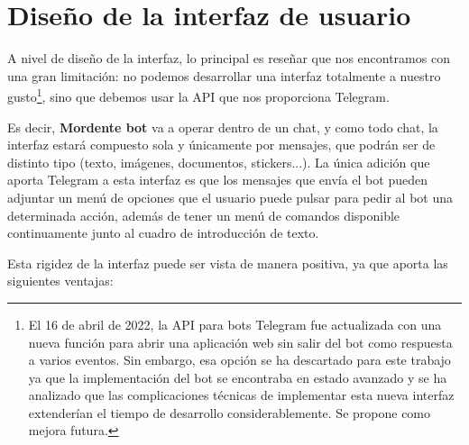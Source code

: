 \chapter{Diseño de la interfaz de usuario}\label{chapter:diu}

A nivel de diseño de la interfaz, lo principal es reseñar que nos encontramos con una gran limitación: no podemos desarrollar una interfaz totalmente a nuestro gusto\footnote{El 16 de abril de 2022, la API para bots Telegram fue actualizada\cite{telegramWebappUpdate} con una nueva función para abrir una aplicación web sin salir del bot como respuesta a varios eventos. Sin embargo, esa opción se ha descartado para este trabajo ya que la implementación del bot se encontraba en estado avanzado y se ha analizado que las complicaciones técnicas de implementar esta nueva interfaz extenderían el tiempo de desarrollo considerablemente. Se propone como mejora futura.}, sino que debemos usar la API que nos proporciona Telegram.

Es decir, \textbf{Mordente bot} va a operar dentro de un chat, y como todo chat, la interfaz estará compuesto sola y únicamente por mensajes, que podrán ser de distinto tipo (texto, imágenes, documentos, stickers...). La única adición que aporta Telegram a esta interfaz es que los mensajes que envía el bot pueden adjuntar un menú de opciones que el usuario puede pulsar para pedir al bot una determinada acción, además de tener un menú de comandos disponible continuamente junto al cuadro de introducción de texto.

Esta rigidez de la interfaz puede ser vista de manera positiva, ya que aporta las siguientes ventajas:

